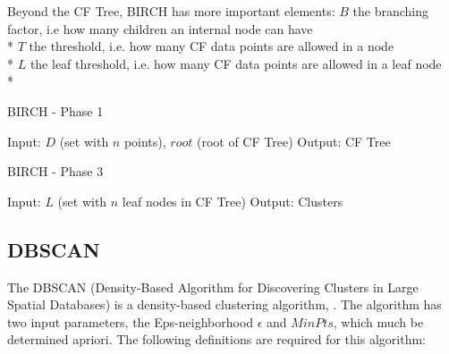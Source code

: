 \documentclass[conference, 10pt]{IEEEtran}
\begin{document}
  Beyond the CF Tree, BIRCH has more important elements:\vspace{1 mm}
  $B$ the branching factor, i.e how many children an internal node can have\\*
  $T$ the threshold, i.e. how many CF data points are allowed in a node\\*
  $L$ the leaf threshold, i.e. how many CF data points are allowed in a leaf node\\*

  \begin{algorithm}
  \caption{BIRCH - Phase 1}
  \begin{algorithmic}[1]
      \State Input: $D$ (set with $n$ points), $root$ (root of CF Tree)
      \State Output: CF Tree
          \Else
        \EndIf
      \EndFor
    \EndProcedure
  \end{algorithmic}
  \end{algorithm}

  \begin{algorithm}
  \caption{BIRCH - Phase 3}
  \begin{algorithmic}[1]
      \State Input: $L$ (set with $n$ leaf nodes in CF Tree)
      \State Output: Clusters
            \EndIf
          \EndFor
        \EndFor
      \EndWhile
    \EndProcedure
  \end{algorithmic}
  \end{algorithm}

  \subsection{DBSCAN}
  The DBSCAN (Density-Based Algorithm for Discovering Clusters in Large Spatial Databases) is a density-based clustering algorithm, . The algorithm has two input parameters, the Eps-neighborhood $\epsilon$ and $MinPts$, which much be determined apriori. The following definitions are required for this algorithm:
\end{document}
